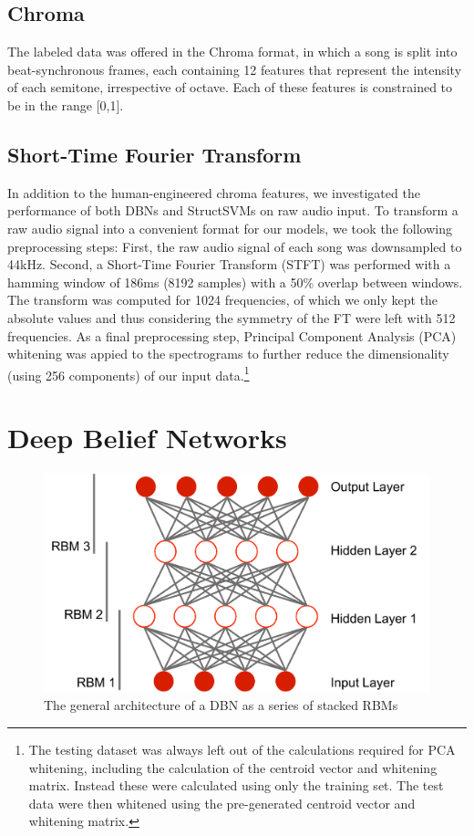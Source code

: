 \documentclass{article}
\begin{document}
\subsection{Chroma}
The labeled data was offered in the Chroma format, in which a song is split into
beat-synchronous frames, each containing 12 features that represent the
intensity of each semitone, irrespective of octave. Each of these features
is constrained to be in the range [0,1].

\subsection{Short-Time Fourier Transform}

In addition to the human-engineered chroma features, we investigated the
performance of both DBNs and StructSVMs on raw audio input. To transform a raw
audio signal into a convenient format for our models, we took the following
preprocessing steps: First, the raw audio signal of each song was downsampled
to 44kHz. Second, a Short-Time Fourier Transform (STFT) was performed with a
hamming window of 186ms (8192 samples) with a 50\% overlap between windows. The
transform was computed for 1024 frequencies, of which we only kept the absolute
values and thus considering the symmetry of the FT were left with 512
frequencies. As a final preprocessing step, Principal Component Analysis (PCA)
whitening was appied to the spectrograms to further reduce the dimensionality
(using 256 components) of our input data.\footnote{The testing dataset was
  always left out of the calculations required for PCA whitening, including the
  calculation of the centroid vector and whitening matrix.  Instead these were
calculated using only the training set. The test data were then whitened using
the pre-generated centroid vector and whitening matrix.}

\section{Deep Belief Networks}
\label{sec:DBN}

\begin{figure}[ht]
\vskip 0.2in
\begin{center}
\centerline{\includegraphics[width=\columnwidth]{images/deep_network_arch.pdf}}
\caption{The general architecture of a DBN as a series of stacked RBMs}
\label{dbn-arch}
\end{center}
\vskip -0.2in
\end{figure}
\end{document}
